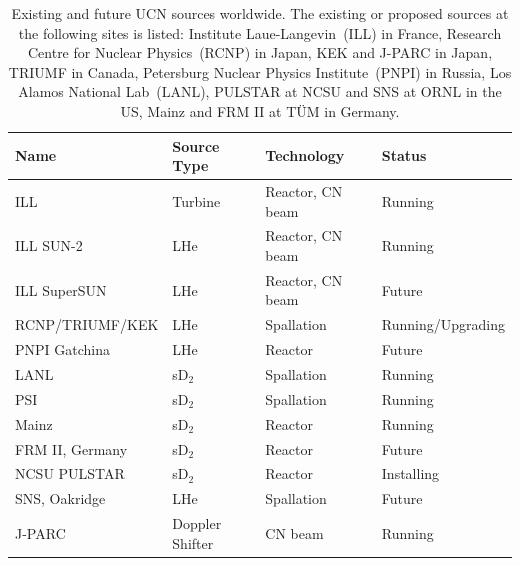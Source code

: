 \begin{table}[h!]
\begin{center}
\begin{tabular}{|l|l|l|l|}
\hline
Name & Source Type & Technology & Status \\
  \hline
  \hline
ILL  & Turbine & Reactor, CN beam & Running
\\
\hline
ILL SUN-2 & LHe & Reactor, CN beam & Running 
\\
\hline
ILL SuperSUN & LHe & Reactor, CN beam & Future
\\
\hline
RCNP/TRIUMF/KEK & LHe & Spallation & Running/Upgrading
\\
\hline
PNPI Gatchina & LHe & Reactor & Future
\\
\hline
LANL & sD$_2$ & Spallation & Running
\\
\hline
PSI & sD$_2$ & Spallation & Running
\\
\hline
Mainz & sD$_2$ & Reactor & Running
\\
\hline
FRM II, Germany & sD$_2$ & Reactor & Future
\\
\hline
NCSU PULSTAR & sD$_2$ & Reactor & Installing
  \\
  \hline
  SNS, Oakridge & LHe & Spallation & Future
  \\
  \hline
  J-PARC & Doppler Shifter & CN beam & Running
  \\
  \hline
\end{tabular}
\end{center}
\caption[UCN facilities worldwide]{Existing and future UCN sources
  worldwide. The existing or proposed sources at the following sites
  is listed: Institute Laue-Langevin~(ILL) in France, Research Centre
  for Nuclear Physics~(RCNP) in Japan, KEK and J-PARC in Japan, TRIUMF
  in Canada, Petersburg Nuclear Physics Institute~(PNPI) in Russia,
  Los Alamos National Lab~(LANL), PULSTAR at NCSU and SNS at ORNL in
  the US, Mainz and FRM II at T{\"U}M in Germany. }
\label{tab:full_ucn_sources}
\end{table}


